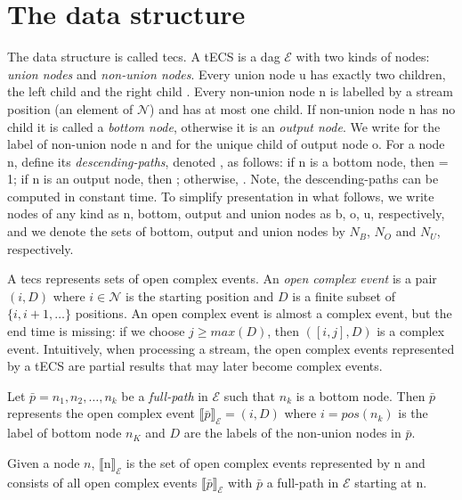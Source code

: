 \section{The data structure}\label{sec:data_structure}

The data structure is called \acrfull{tecs}. A tECS is a \acrfull{dag} $\mathcal{E}$ with two kinds of nodes: \emph{union nodes} and \emph{non-union nodes}. Every union node \textrm{u} has exactly two children, the left child  and the right child . Every non-union node \textrm{n} is labelled by a stream position (an element of $\mathcal{N}$) and has at most one child. If non-union node \textrm{n} has no child it is called a \emph{bottom node}, otherwise it is an \emph{output node}. We write  for the label of non-union node \textrm{n} and  for the unique child of output node \textrm{o}. For a node \textrm{n}, define its \emph{descending-paths}, denoted , as follows: if n is a bottom node, then  = 1; if n is an output node, then ; otherwise, . Note, the descending-paths can be computed in constant time. To simplify presentation in what follows, we write nodes of any kind as \textrm{n}, bottom, output and union nodes as \textrm{b, o, u}, respectively, and we denote the sets of bottom, output and union nodes by $N_{B}$, $N_{O}$ and $N_{U}$, respectively.

A \acrshort{tecs} represents sets of open complex events. An \emph{open complex event} is a pair $(i, D)$ where $i \in \mathcal{N}$ is the starting position and $D$ is a finite subset of $\{i, i+1, \ldots\}$ positions. An open complex event is almost a complex event, but the end time is missing: if we choose $j \ge max(D)$, then $([i, j], D)$ is a complex event. Intuitively, when processing a stream, the open complex events represented by a tECS are partial results that may later become complex events.

Let $\bar{p} = n_{1}, n_{2}, \ldots, n_{k}$ be a \emph{full-path} in $\mathcal{E}$ such that $n_{k}$ is a bottom node. Then $\bar{p}$ represents the open complex event ${\llbracket \bar{p} \rrbracket}_{\mathcal{E}} = (i, D)$ where $i = pos(n_{k})$ is the label of bottom node $n_{K}$ and $D$ are the labels of the non-union nodes in $\bar{p}$.

Given a node $n$, ${\llbracket \textrm{n} \rrbracket}_{\mathcal{E}}$ is the set of open complex events represented by \textrm{n} and consists of all open complex events ${\llbracket \bar{p} \rrbracket}_{\mathcal{E}}$ with $\bar{p}$ a full-path in $\mathcal{E}$ starting at \textrm{n}.

